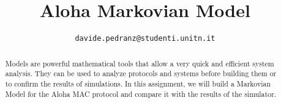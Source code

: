\documentclass[conference]{IEEEtran}
\begin{document}
\title{Aloha Markovian Model}
\author{
	\texttt{davide.pedranz@studenti.unitn.it}
}

\maketitle

\begin{abstract}
Models are powerful mathematical tools that allow a very quick and efficient system analysis.
They can be used to analyze protocols and systems before building them or to confirm the results of simulations.
In this assignment, we will build a Markovian Model for the Aloha MAC protocol and compare it with the results of the simulator. 
\end{abstract}

\acresetall













\end{document}
